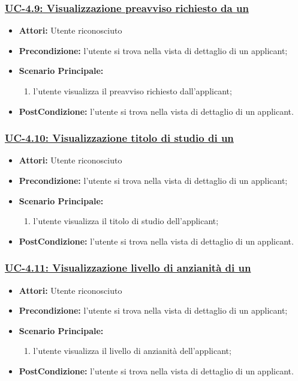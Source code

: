 \subsubsection{\underline{UC-4.9: Visualizzazione preavviso richiesto da un \applicant}}
\begin{itemize}
	\item \textbf{Attori:} Utente riconosciuto
	\item \textbf{Precondizione:} l'utente si trova nella vista di dettaglio di un applicant;
	\item \textbf{Scenario Principale:}
	\begin{enumerate} 
		\item l'utente visualizza il preavviso richiesto dall'applicant;
	\end{enumerate}
	\item \textbf{PostCondizione:} l'utente si trova nella vista di dettaglio di un applicant.
\end{itemize}

\subsubsection{\underline{UC-4.10: Visualizzazione titolo di studio di un \applicant}}
\begin{itemize}
	\item \textbf{Attori:} Utente riconosciuto
	\item \textbf{Precondizione:} l'utente si trova nella vista di dettaglio di un applicant;
	\item \textbf{Scenario Principale:}
	\begin{enumerate} 
		\item l'utente visualizza il titolo di studio dell'applicant;
	\end{enumerate}
	\item \textbf{PostCondizione:} l'utente si trova nella vista di dettaglio di un applicant.
\end{itemize}

\subsubsection{\underline{UC-4.11: Visualizzazione livello di anzianità di un \applicant}}
\begin{itemize}
	\item \textbf{Attori:} Utente riconosciuto
	\item \textbf{Precondizione:} l'utente si trova nella vista di dettaglio di un applicant;
	\item \textbf{Scenario Principale:}
	\begin{enumerate} 
		\item l'utente visualizza il livello di anzianità dell'applicant;
	\end{enumerate}
	\item \textbf{PostCondizione:} l'utente si trova nella vista di dettaglio di un applicant.
\end{itemize}


